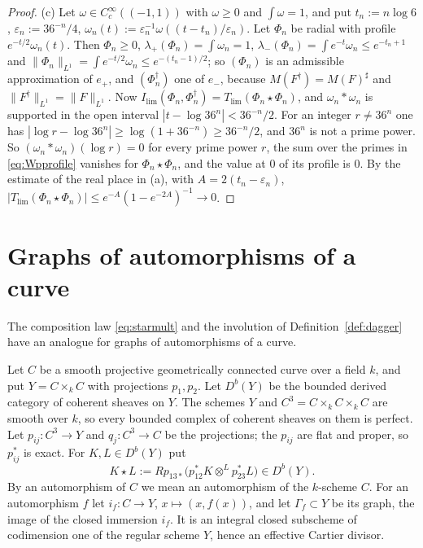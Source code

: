 \documentclass[11pt]{amsart}
\theoremstyle{definition}
\theoremstyle{remark}
\begin{document}
\begin{proof}
(c)  Let $\omega\in C_c^{\infty}((-1,1))$ with $\omega\ge0$ and $\int\omega=1$, and
put $t_n:=n\log6$, $\varepsilon_n:=36^{-n}/4$,
$\omega_n(t):=\varepsilon_n^{-1}\omega((t-t_n)/\varepsilon_n)$.  Let $\Phi_n$ be
radial with profile $e^{-t/2}\omega_n(t)$.  Then $\Phi_n\ge0$,
$\lambda_+(\Phi_n)=\int\omega_n=1$,
$\lambda_-(\Phi_n)=\int e^{-t}\omega_n\le e^{-t_n+1}$ and
$\lVert \Phi_n\rVert_{L^1}=\int e^{-t/2}\omega_n\le e^{-(t_n-1)/2}$; so
$(\Phi_n)$ is an admissible approximation of $e_+$, and $(\Phi_n^{\dagger})$ one of $e_-$,
because $M(F^{\dagger})=M(F)^{\sharp}$ and
$\lVert F^{\dagger}\rVert_{L^1}=\lVert F\rVert_{L^1}$.  Now
$I_{\lim}(\Phi_n,\Phi_n^{\dagger})=T_{\lim}(\Phi_n\star \Phi_n)$, and
$\omega_n*\omega_n$ is supported in the open interval
$|t-\log36^{n}|<36^{-n}/2$.  For an integer $r\ne36^{n}$ one has
$|\log r-\log36^{n}|\ge\log(1+36^{-n})\ge36^{-n}/2$, and $36^{n}$ is not a
prime power.  So $(\omega_n*\omega_n)(\log r)=0$ for every prime power $r$, the
sum over the primes in \eqref{eq:Wpprofile} vanishes for
$\Phi_n\star\Phi_n$, and the value at $0$ of its profile is $0$.  By the estimate of the real place in
(a), with $A=2(t_n-\varepsilon_n)$,
$|T_{\lim}(\Phi_n\star \Phi_n)|\le e^{-A}(1-e^{-2A})^{-1}\to0$.
\end{proof}

\section{Graphs of automorphisms of a curve}\label{sec:classical}

The composition law \eqref{eq:starmult} and the involution of
Definition~\ref{def:dagger} have an analogue for graphs of automorphisms of a
curve.

Let $C$ be a smooth projective geometrically connected curve over a field
$k$, and put $Y=C\times_kC$ with projections $p_1,p_2$.  Let $D^{b}(Y)$ be the
bounded derived category of coherent sheaves on $Y$.  The schemes $Y$ and
$C^{3}=C\times_kC\times_kC$ are smooth over $k$, so every bounded complex of
coherent sheaves on them is perfect.  Let $p_{ij}:C^{3}\to Y$ and
$q_j:C^{3}\to C$ be the projections; the $p_{ij}$ are flat and proper, so
$p_{ij}^{*}$ is exact.  For $K,L\in D^{b}(Y)$ put
\[
K\star L:=Rp_{13*}\bigl(p_{12}^{*}K\otimes^{L}p_{23}^{*}L\bigr)\in D^{b}(Y).
\]
By an automorphism of $C$ we mean an automorphism of the $k$-scheme $C$.  For
an automorphism $f$ let $i_f:C\to Y$, $x\mapsto(x,f(x))$, and let
$\Gamma_f\subset Y$ be its graph, the image of the closed immersion $i_f$.
It is an integral closed subscheme of codimension one of the regular scheme
$Y$, hence an effective Cartier divisor.
\end{document}
